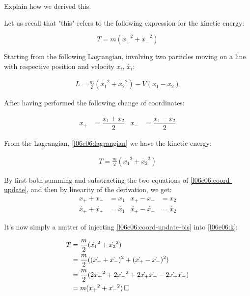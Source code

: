 \documentclass[solutions.tex]{subfiles}
\begin{document}
\maketitle
\begin{exercise}
Explain how we derived this.
\end{exercise}

Let us recall that "this" refers to the following expression for the
kinetic energy:

\[
	T = m (\dot{x_+}^2+\dot{x_-}^2)
\]

Starting from the following Lagrangian, involving two particles
moving on a line with respective position and velocity $x_i$, $\dot{x_i}$:

\begin{align}\label{l06e06:lagrangian}
	L = \frac{m}{2}(\dot{x_1}^2+\dot{x_2}^2)-V(x_1-x_2)
\end{align}

After having performed the following change of coordinates:

\begin{align}
	x_+ &= \dfrac{x_1+x_2}{2} &
	x_- &= \dfrac{x_1-x_2}{2} \label{l06e06:coord-update}
\end{align}

From the Lagrangian, \eqref{l06e06:lagrangian} we have the kinetic energy:

\begin{align}\label{l06e06:k}
	T = \frac{m}{2}(\dot{x_1}^2+\dot{x_2}^2)
\end{align}

By first both summing and substracting the two equations of
\eqref{l06e06:coord-update}, and then by linearity of the derivation,
we get:
\begin{align}
	x_+ + x_- &= x_1 &
	x_+ - x_- &= x_2 \nonumber \\
	\dot{x_+} + \dot{x_-} &= \dot{x_1} &
	\dot{x_+} - \dot{x_-} &= \dot{x_2} \label{l06e06:coord-update-bis}
\end{align}

It's now simply a matter of injecting \eqref{l06e06:coord-update-bis}
into \eqref{l06e06:k}:

\begin{align*}
	T &= \dfrac{m}{2}(\dot{x_1}^2+\dot{x_2}^2) \\
	~ &= \dfrac{m}{2}((\dot{x_+} + \dot{x_-})^2+(\dot{x_+} - \dot{x_-})^2) \\
	~ &= \dfrac{m}{2}(
		2\dot{x_+}^2 +
		2\dot{x_-}^2 +
		2\dot{x_+}\dot{x_-} - 2\dot{x_+}\dot{x_-}
	) \\
	~ &= m(\dot{x_+}^2 +\dot{x_-}^2) \qed
\end{align*}
\end{document}

